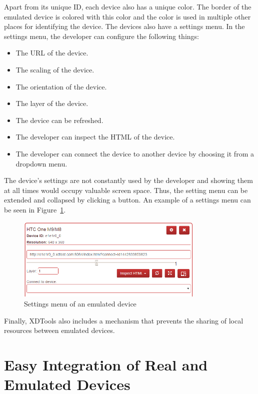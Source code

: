 Apart from its unique ID, each device also has a unique color. The border of the emulated device is colored with this color and the color is used in multiple other places for identifying the device. The devices also have a settings menu. In the settings menu, the developer can configure the following things:
\begin{itemize}
	\item The URL of the device.
	\item The scaling of the device.
	\item The orientation of the device.
	\item The layer of the device. 
	\item The device can be refreshed.
	\item The developer can inspect the HTML of the device.
	\item The developer can connect the device to another device by choosing it from a dropdown menu.
\end{itemize}
The device's settings are not constantly used by the developer and showing them at all times would occupy valuable screen space. Thus, the setting menu can be extended and collapsed by clicking a button. An example of a settings menu can be seen in Figure~\ref{fig:settings_menu}. 

\begin{figure}[H]
  \centering
    \includegraphics[width=0.8\textwidth]{images/screenshots/settings_menu_2.png}
	\caption[Screenshot: Settings menu emulated device]{Settings menu of an emulated device}
	\label{fig:settings_menu}
\end{figure}

Finally, XDTools also includes a mechanism that prevents the sharing of local resources between emulated devices.
 
\section{Easy Integration of Real and Emulated Devices}

